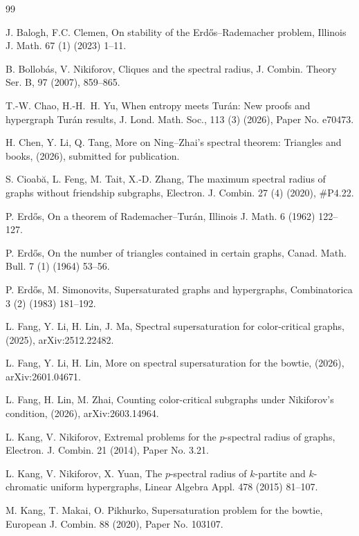\documentclass[11pt,a4paper]{article}
\theoremstyle{definition}
\theoremstyle{plain}
\begin{document}
\begin{thebibliography}{99}


 J. Balogh, F.C. Clemen, 
 On stability of the Erd\H{o}s--Rademacher problem, 
 Illinois J. Math. 67 (1) (2023) 1--11. 

B. Bollob{\'a}s, V. Nikiforov, 
Cliques and the spectral radius, 
{J. Combin. Theory Ser. B}, 97 (2007), 859--865.

T.-W. Chao, H.-H.~H. Yu, 
When entropy meets {Turán}: {New} proofs and hypergraph {Turán} results, 
{J. Lond. Math. Soc.}, 113 (3) (2026), Paper No. e70473.

H. Chen, Y. Li, Q. Tang, 
More on Ning--Zhai's spectral theorem: Triangles and books, 
(2026), submitted for publication. 


 S. Cioab\u{a}, L. Feng, M. Tait, X.-D. Zhang, 
The maximum spectral radius of graphs without friendship subgraphs, 
 Electron. J. Combin. 27 (4) (2020), \#P4.22.


P. Erd\H{o}s,
On a theorem of Rademacher--Tur\'{a}n,
Illinois J. Math. 6 (1962) 122--127. 


P. Erd\H{o}s,  
On the number of triangles contained in certain graphs, 
Canad. Math. Bull. 7 (1) (1964) 53--56. 


P. Erd\H{o}s, M. Simonovits,
Supersaturated graphs and hypergraphs,
Combinatorica 3 (2) (1983) 181--192.
 

L. Fang, Y. Li, H. Lin, J. Ma, 
Spectral supersaturation for color-critical graphs, (2025), arXiv:2512.22482. 


L. Fang, Y. Li, H. Lin, 
More on spectral supersaturation for the bowtie, 
(2026), arXiv:2601.04671. 

L. Fang, H. Lin, M. Zhai,
{Counting color-critical subgraphs under Nikiforov's condition},  
(2026), arXiv:2603.14964.

L. Kang, V. Nikiforov, 
Extremal problems for the $p$-spectral radius of graphs, Electron. J. Combin. 21 (2014), Paper No. 3.21.

L. Kang, V. Nikiforov, X. Yuan,
The $p$-spectral radius of $k$-partite and $k$-chromatic
uniform hypergraphs, 
Linear Algebra Appl. 478 (2015) 81--107. 

M. Kang, T. Makai, O. Pikhurko, 
Supersaturation problem for the bowtie, 
European J. Combin. 88 (2020), Paper No. 103107. 


\end{thebibliography}
\end{document}
